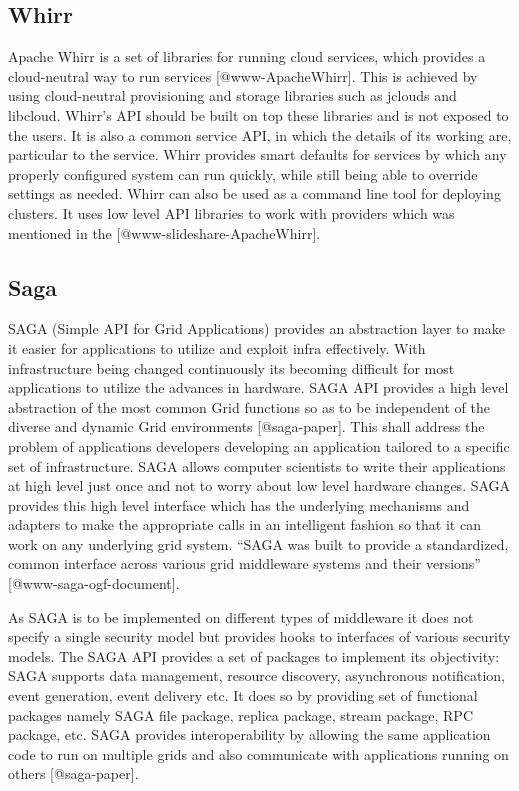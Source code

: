 \subsection{Whirr}
     
Apache Whirr is a set of libraries for running cloud services, which
provides a cloud-neutral way to run
services [@www-ApacheWhirr]. This is achieved by using
cloud-neutral provisioning and storage libraries such as jclouds and
libcloud. Whirr's API should be built on top these libraries and is
not exposed to the users. It is also a common service API, in which
the details of its working are, particular to the service.  Whirr
provides smart defaults for services by which any properly configured
system can run quickly, while still being able to override settings as
needed. Whirr can also be used as a command line tool for deploying
clusters. It uses low level API libraries to work with providers which
was mentioned in the [@www-slideshare-ApacheWhirr].

     
\subsection{Saga}

SAGA (Simple API for Grid Applications) provides an abstraction layer
to make it easier for applications to utilize and exploit infra
effectively. With infrastructure being changed continuously its
becoming difficult for most applications to utilize the advances in
hardware. SAGA API provides a high level abstraction of the most
common Grid functions so as to be independent of the diverse and
dynamic Grid environments [@saga-paper]. This shall address the
problem of applications developers developing an application tailored
to a specific set of infrastructure.  SAGA allows computer scientists
to write their applications at high level just once and not to worry
about low level hardware changes. SAGA provides this high level
interface which has the underlying mechanisms and adapters to make the
appropriate calls in an intelligent fashion so that it can work on any
underlying grid system. ``SAGA was built to provide a standardized,
common interface across various grid middleware systems and their
versions'' [@www-saga-ogf-document].

As SAGA is to be implemented on different types of middleware it does
not specify a single security model but provides hooks to interfaces
of various security models. The SAGA API provides a set of packages to
implement its objectivity: SAGA supports data management, resource
discovery, asynchronous notification, event generation, event delivery
etc. It does so by providing set of functional packages namely SAGA
file package, replica package, stream package, RPC package, etc. SAGA
provides interoperability by allowing the same application code to run
on multiple grids and also communicate with applications running on
others [@saga-paper].


